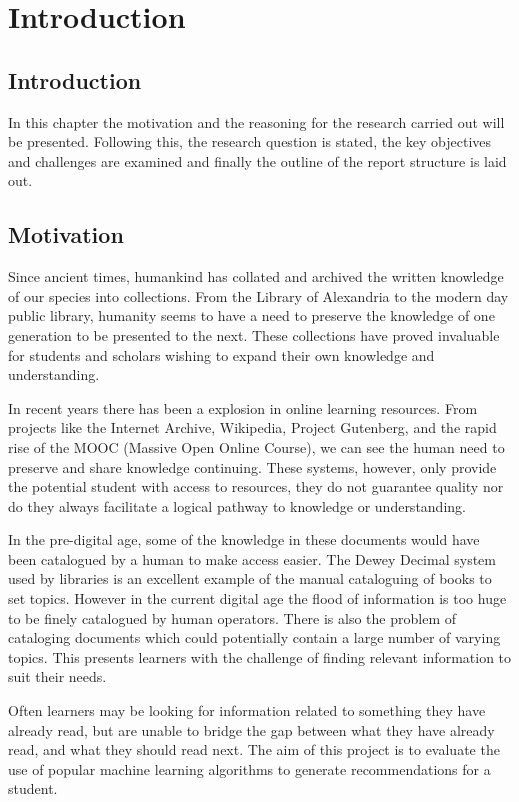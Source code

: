 \chapter{Introduction}

\section{Introduction}

In this chapter the motivation and the reasoning for the research carried out will be presented.
Following this, the research question is stated, the key objectives and challenges are examined and finally the outline of the report structure is laid out.

\section{Motivation}

Since ancient times, humankind has collated and archived the written knowledge of our species into collections.
From the Library of Alexandria to the modern day public library, humanity seems to have a need to preserve the knowledge of one generation to be presented to the next.
These collections have proved invaluable for students and scholars wishing to expand their own knowledge and understanding.

In recent years there has been a explosion in online learning resources.
From projects like the Internet Archive, Wikipedia, Project Gutenberg, and the rapid rise of the MOOC (Massive Open Online Course), we can see the human need to preserve and share knowledge continuing.
These systems, however, only provide the potential student with access to resources, they do not guarantee quality nor do they always facilitate a logical pathway to knowledge or understanding.

In the pre-digital age, some of the knowledge in these documents would have been catalogued by a human to make access easier.
The Dewey Decimal system used by libraries is an excellent example of the manual cataloguing of books to set topics.
However in the current digital age the flood of information is too huge to be finely catalogued by human operators.
There is also the problem of cataloging documents which could potentially contain a large number of varying topics.
This presents learners with the challenge of finding relevant information to suit their needs.

Often learners may be looking for information related to something they have already read, but are unable to bridge the gap between what they have already read, and what they should read next.
The aim of this project is to evaluate the use of popular machine learning algorithms to generate recommendations for a student.

